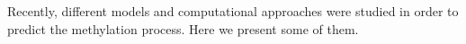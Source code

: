 
Recently, different models and computational approaches were studied in order to predict the methylation process. Here we present some of them.\\

